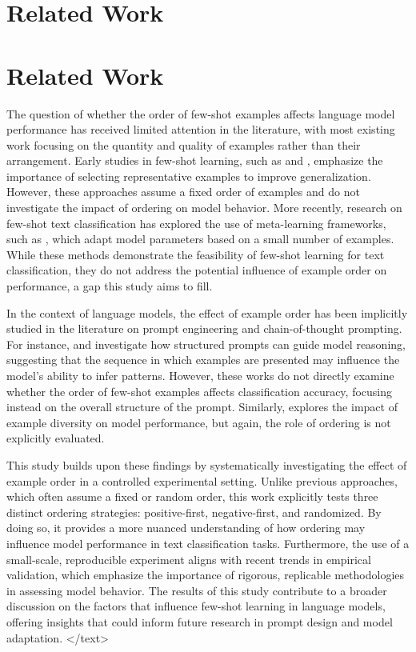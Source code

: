 \documentclass{article}
\begin{document}
\section{Related Work}
\section{Related Work}

The question of whether the order of few-shot examples affects language model performance has received limited attention in the literature, with most existing work focusing on the quantity and quality of examples rather than their arrangement. Early studies in few-shot learning, such as \cite{vinyals2016matching} and \cite{snell2017prototypical}, emphasize the importance of selecting representative examples to improve generalization. However, these approaches assume a fixed order of examples and do not investigate the impact of ordering on model behavior. More recently, research on few-shot text classification has explored the use of meta-learning frameworks, such as \cite{rabinowitz2016meta}, which adapt model parameters based on a small number of examples. While these methods demonstrate the feasibility of few-shot learning for text classification, they do not address the potential influence of example order on performance, a gap this study aims to fill.

In the context of language models, the effect of example order has been implicitly studied in the literature on prompt engineering and chain-of-thought prompting. For instance, \cite{chen2021scaling} and \cite{scheule2022chain} investigate how structured prompts can guide model reasoning, suggesting that the sequence in which examples are presented may influence the model's ability to infer patterns. However, these works do not directly examine whether the order of few-shot examples affects classification accuracy, focusing instead on the overall structure of the prompt. Similarly, \cite{wu2022few} explores the impact of example diversity on model performance, but again, the role of ordering is not explicitly evaluated.

This study builds upon these findings by systematically investigating the effect of example order in a controlled experimental setting. Unlike previous approaches, which often assume a fixed or random order, this work explicitly tests three distinct ordering strategies: positive-first, negative-first, and randomized. By doing so, it provides a more nuanced understanding of how ordering may influence model performance in text classification tasks. Furthermore, the use of a small-scale, reproducible experiment aligns with recent trends in empirical validation, which emphasize the importance of rigorous, replicable methodologies in assessing model behavior. The results of this study contribute to a broader discussion on the factors that influence few-shot learning in language models, offering insights that could inform future research in prompt design and model adaptation.
</text>
\end{document}
